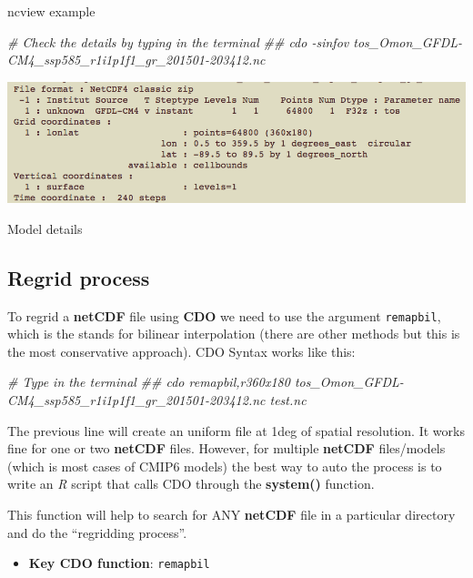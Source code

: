 \documentclass[]{book}
\newenvironment{Shaded}{\begin{snugshade}}{\end{snugshade}}
\newcommand{\CommentTok}[1]{\textcolor[rgb]{0.56,0.35,0.01}{\textit{#1}}}
\providecommand{\tightlist}{%
  \setlength{\itemsep}{0pt}\setlength{\parskip}{0pt}}
\begin{document}
ncview example

\begin{Shaded}
\begin{Highlighting}[]
\CommentTok{# Check the details by typing in the terminal}
\CommentTok{## cdo -sinfov tos_Omon_GFDL-CM4_ssp585_r1i1p1f1_gr_201501-203412.nc}
\end{Highlighting}
\end{Shaded}

\includegraphics[width=1\linewidth]{images/ncview02}

Model details

\hypertarget{regrid-process}{%
\subsection{Regrid process}\label{regrid-process}}

To regrid a \textbf{netCDF} file using \textbf{CDO} we need to use the argument \texttt{remapbil}, which is the stands for bilinear interpolation (there are other methods but this is the most conservative approach). CDO Syntax works like this:

\begin{Shaded}
\begin{Highlighting}[]
\CommentTok{# Type in the terminal}
\CommentTok{## cdo remapbil,r360x180 tos_Omon_GFDL-CM4_ssp585_r1i1p1f1_gr_201501-203412.nc test.nc}
\end{Highlighting}
\end{Shaded}

The previous line will create an uniform file at 1deg of spatial resolution. It works fine for one or two \textbf{netCDF} files. However, for multiple \textbf{netCDF} files/models (which is most cases of CMIP6 models) the best way to auto the process is to write an \emph{R} script that calls CDO through the \textbf{system()} function.

This function will help to search for ANY \textbf{netCDF} file in a particular directory and do the ``regridding process''.

\begin{itemize}
\tightlist
\item
  \textbf{Key CDO function}: \texttt{remapbil}
\end{itemize}
\end{document}
